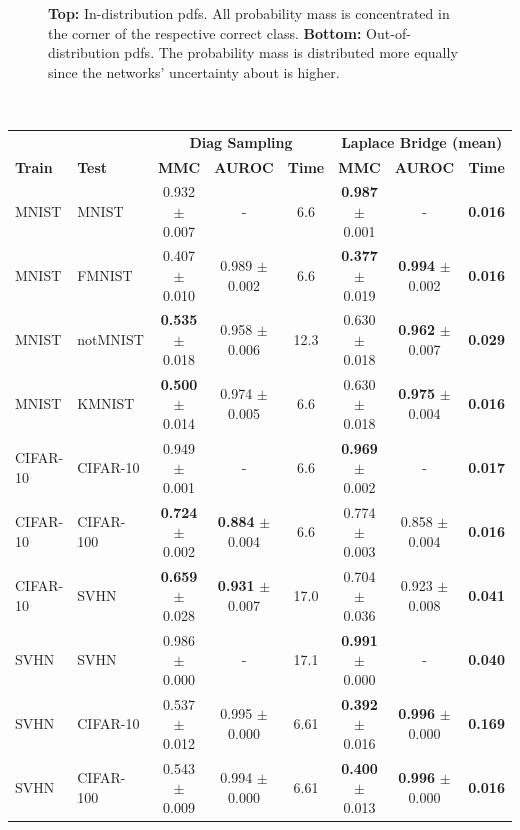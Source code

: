 \begin{figure}[htb]
    \caption{\textbf{Top:} In-distribution pdfs. All probability mass is concentrated in the corner of the respective correct class. \textbf{Bottom:} Out-of-distribution pdfs. The probability mass is distributed more equally since the networks' uncertainty about is higher.}
    \label{fig:MNIST_ID_OOD}
\end{figure}\


\begin{table}[h!]
	\scriptsize
    \centering
    \begin{tabular}{l  l || c c  c | c  c  c}
	     \toprule
         & & \multicolumn{3}{c}{\textbf{Diag Sampling}} &  \multicolumn{3}{c}{\textbf{Laplace Bridge (mean)}}\\
         \textbf{Train} & \textbf{Test} & \textbf{MMC} & \textbf{AUROC} & \textbf{Time} & \textbf{MMC} & \textbf{AUROC} &  \textbf{Time}\\
         \midrule
         MNIST & MNIST & 0.932 $\pm$ 0.007 & - & 6.6 & \textbf{0.987} $\pm$ 0.001 & - & \textbf{0.016} \\
         MNIST & FMNIST & 0.407 $\pm$ 0.010 & 0.989 $\pm$ 0.002 & 6.6 & \textbf{0.377} $\pm$ 0.019 & \textbf{0.994} $\pm$ 0.002 &  \textbf{0.016}\\
         MNIST & notMNIST & \textbf{0.535} $\pm$ 0.018 & 0.958 $\pm$ 0.006 & 12.3 & 0.630 $\pm$ 0.018 & \textbf{0.962} $\pm$ 0.007 &  \textbf{0.029}\\
         MNIST & KMNIST & \textbf{0.500} $\pm$ 0.014 & 0.974 $\pm$ 0.005 & 6.6 & 0.630 $\pm$ 0.018 & \textbf{0.975} $\pm$ 0.004 & \textbf{0.016} \\
         \midrule
         CIFAR-10 & CIFAR-10 & 0.949 $\pm$ 0.001 & - & 6.6 & \textbf{0.969} $\pm$ 0.002 & - & \textbf{0.017} \\
         CIFAR-10 & CIFAR-100 & \textbf{0.724} $\pm$ 0.002 & \textbf{0.884} $\pm$ 0.004 & 6.6 & 0.774 $\pm$ 0.003 & 0.858 $\pm$ 0.004 & \textbf{0.016} \\
         CIFAR-10 & SVHN & \textbf{0.659} $\pm$ 0.028 & \textbf{0.931} $\pm$ 0.007 & 17.0 & 0.704 $\pm$ 0.036 & 0.923 $\pm$ 0.008 & \textbf{0.041} \\
         \midrule
         SVHN & SVHN & 0.986 $\pm$ 0.000 & - & 17.1 & \textbf{0.991} $\pm$ 0.000 & - & \textbf{0.040} \\
         SVHN & CIFAR-10 & 0.537 $\pm$ 0.012 & 0.995 $\pm$ 0.000 & 6.61 & \textbf{0.392} $\pm$ 0.016 & \textbf{0.996} $\pm$ 0.000 & \textbf{0.169} \\
         SVHN & CIFAR-100 & 0.543 $\pm$ 0.009 & 0.994 $\pm$ 0.000 & 6.61 & \textbf{0.400} $\pm$ 0.013 & \textbf{0.996} $\pm$ 0.000 & \textbf{0.016} \\

\end{tabular}
\end{table}
